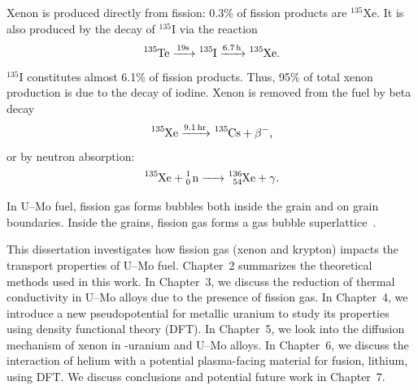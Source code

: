 Xenon is produced directly from fission: 0.3\% of fission products are $^{135}$Xe. It is also produced by the decay of $^{135}$I via the reaction
\begin{equation*}
\ce{^{135}Te ->[$19 \text{s}$] ^{135}I ->[6.7h] ^{135}Xe}.
\end{equation*}
$^{135}$I constitutes almost 6.1\% of fission products. Thus, 95\% of total xenon production is due to the decay of iodine. Xenon is removed from the fuel by  beta decay 
\begin{equation*}
\ce{^{135}Xe ->[9.1 $\text{hr}$] ^{135}Cs + $\beta^{-}$},
\end{equation*}
or by neutron absorption:
\begin{equation*}
\ce{^{135}Xe + ^1_0 n -> ^{136}_{54}Xe + $\gamma$}.
\end{equation*}

In U--Mo fuel, fission gas forms bubbles  both inside the grain and on grain boundaries. Inside the grains, fission gas forms a gas bubble superlattice~\cite{miller2012advantages, gan2010transmission}. 

This dissertation investigates how fission gas (xenon and krypton) impacts the transport properties of U--Mo fuel. Chapter~2 summarizes the theoretical methods used in this work. In Chapter~3, we discuss the reduction of thermal conductivity in U--Mo alloys due to the presence of fission gas. In Chapter~4, we introduce a new pseudopotential for metallic uranium to study its properties using density functional theory (DFT)\@. In Chapter~5, we look into the diffusion mechanism of xenon in \textgamma-uranium and U--Mo alloys. In Chapter~6, we discuss the interaction of helium with a potential plasma-facing material for fusion, lithium, using DFT\@. We discuss conclusions and potential future work in Chapter~7. 




















%

